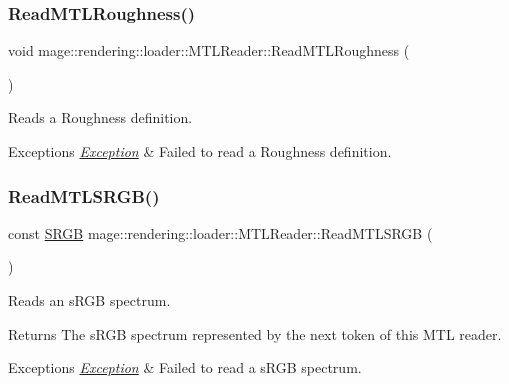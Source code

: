 \subsubsection{\texorpdfstring{Read\+M\+T\+L\+Roughness()}{ReadMTLRoughness()}}
{\footnotesize\ttfamily void mage\+::rendering\+::loader\+::\+M\+T\+L\+Reader\+::\+Read\+M\+T\+L\+Roughness (\begin{DoxyParamCaption}{ }\end{DoxyParamCaption})\hspace{0.3cm}{\ttfamily [private]}}

Reads a Roughness definition.


\begin{DoxyExceptions}{Exceptions}
{\em \hyperlink{classmage_1_1_exception}{Exception}} & Failed to read a Roughness definition. \\
\hline
\end{DoxyExceptions}
\hypertarget{classmage_1_1rendering_1_1loader_1_1_m_t_l_reader_aaefa7c67f90d7d592366acdb898993b3}{}\label{classmage_1_1rendering_1_1loader_1_1_m_t_l_reader_aaefa7c67f90d7d592366acdb898993b3} 
\subsubsection{\texorpdfstring{Read\+M\+T\+L\+S\+R\+G\+B()}{ReadMTLSRGB()}}
{\footnotesize\ttfamily const \hyperlink{structmage_1_1_s_r_g_b}{S\+R\+GB} mage\+::rendering\+::loader\+::\+M\+T\+L\+Reader\+::\+Read\+M\+T\+L\+S\+R\+GB (\begin{DoxyParamCaption}{ }\end{DoxyParamCaption})\hspace{0.3cm}{\ttfamily [private]}}

Reads an s\+R\+GB spectrum.

\begin{DoxyReturn}{Returns}
The s\+R\+GB spectrum represented by the next token of this M\+TL reader. 
\end{DoxyReturn}

\begin{DoxyExceptions}{Exceptions}
{\em \hyperlink{classmage_1_1_exception}{Exception}} & Failed to read a s\+R\+GB spectrum. \\
\hline
\end{DoxyExceptions}
\hypertarget{classmage_1_1rendering_1_1loader_1_1_m_t_l_reader_a5b03c5c7aee393e60ea6c3bd7ff15614}{}\label{classmage_1_1rendering_1_1loader_1_1_m_t_l_reader_a5b03c5c7aee393e60ea6c3bd7ff15614} 

